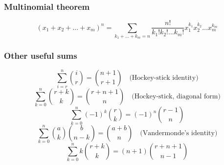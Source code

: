 \subsubsection*{Multinomial theorem}
\[
(x_1+x_2+\dots+x_m)^n = \sum_{k_1+\dots+k_m=n} \frac{n!}{k_1!k_2!\dots k_m!} x_1^{k_1}x_2^{k_2}\dots x_m^{k_m}
\]

\subsubsection*{Other useful sums}
\[
\sum_{i=r}^{n} \binom{i}{r} = \binom{n+1}{r+1} \quad \text{(Hockey-stick identity)}
\]
\[
\sum_{k=0}^{n}\binom{r+k}{k} = \binom{r+n+1}{n} \quad \text{(Hockey-stick, diagonal form)}
\]
\[
\sum_{k=0}^{n}(-1)^k\binom{r}{k} = (-1)^n\binom{r-1}{n}
\]
\[
\sum_{k=0}^{n} \binom{a}{k}\binom{b}{n-k} = \binom{a+b}{n} \quad \text{(Vandermonde's identity)}
\]
\[
\sum_{k=0}^{n} k\binom{r+k}{k} = (n+1)\binom{r+n+1}{n-1}
\]
